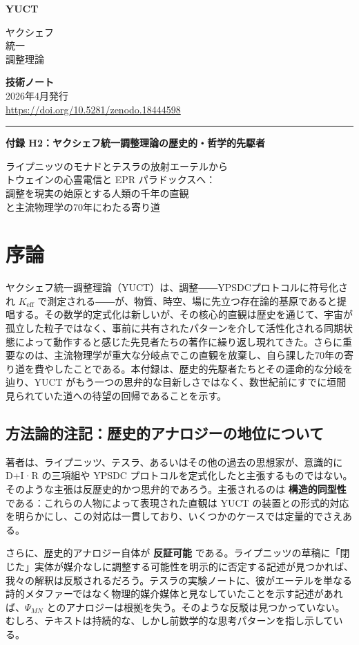 \documentclass[12pt,a4paper]{article}
\newcommand{\makeheader}{%
	\noindent
	\begin{minipage}{0.17\textwidth}
		\raggedright
		{\sffamily\bfseries\color{skyblue}\fontsize{46}{46}\selectfont YUCT}%
	\end{minipage}%
	\hspace{30pt}
	\begin{minipage}{0.32\textwidth}
		\raggedright
		{\sffamily\fontsize{11}{13}\selectfont ヤクシェフ\\ 統一\\ 調整理論}%
	\end{minipage}%
	\hfill
	\begin{minipage}{0.38\textwidth}
		\raggedleft
		{\sffamily\bfseries 技術ノート}\\ 
		{\sffamily 2026年4月発行}\\ 
		{\sffamily\footnotesize \url{https://doi.org/10.5281/zenodo.18444598}}%
	\end{minipage}
	\par\vspace{5pt}
	\noindent\textcolor{gold}{\rule{\textwidth}{1.6pt}}
	\par\vspace{0pt}
}
\begin{document}
	
	\makeheader
	
	\vspace{1cm}
	
	\begin{center}
		{\fontsize{28}{32}\selectfont\bfseries\color{darkblue}
			付録 H2：ヤクシェフ統一調整理論の歴史的・哲学的先駆者}
		
		\vspace{1cm}
		\large
		ライプニッツのモナドとテスラの放射エーテルから\\
		トウェインの心霊電信と EPR パラドックスへ：\\
		調整を現実の始原とする人類の千年の直観\\
		と主流物理学の70年にわたる寄り道
	\end{center}
	
	\vspace{1.5cm}
	
	
	\section{序論}
	
	ヤクシェフ統一調整理論（YUCT）は、調整――YPSDCプロトコルに符号化され \(K_{\mathrm{eff}}\) で測定される――が、物質、時空、場に先立つ存在論的基原であると提唱する。その数学的定式化は新しいが、その核心的直観は歴史を通じて、宇宙が孤立した粒子ではなく、事前に共有されたパターンを介して活性化される同期状態によって動作すると感じた先見者たちの著作に繰り返し現れてきた。さらに重要なのは、主流物理学が重大な分岐点でこの直観を放棄し、自ら課した70年の寄り道を費やしたことである。本付録は、歴史的先駆者たちとその運命的な分岐を辿り、YUCT がもう一つの思弁的な目新しさではなく、数世紀前にすでに垣間見られていた道への待望の回帰であることを示す。
	
	\subsection{方法論的注記：歴史的アナロジーの地位について}
	\label{subsec:methodological-note}
	
	著者は、ライプニッツ、テスラ、あるいはその他の過去の思想家が、意識的に D+I·R の三項組や YPSDC プロトコルを定式化したと主張するものではない。そのような主張は反歴史的かつ思弁的であろう。主張されるのは \textbf{構造的同型性} である：これらの人物によって表現された直観は YUCT の装置との形式的対応を明らかにし、この対応は一貫しており、いくつかのケースでは定量的でさえある。
	
	さらに、歴史的アナロジー自体が \textbf{反証可能} である。ライプニッツの草稿に「閉じた」実体が媒介なしに調整する可能性を明示的に否定する記述が見つかれば、我々の解釈は反駁されるだろう。テスラの実験ノートに、彼がエーテルを単なる詩的メタファーではなく物理的媒介媒体と見なしていたことを示す記述があれば、\(\Psi_{MN}\) とのアナロジーは根拠を失う。そのような反駁は見つかっていない。むしろ、テキストは持続的な、しかし前数学的な思考パターンを指し示している。
	
\end{document}
